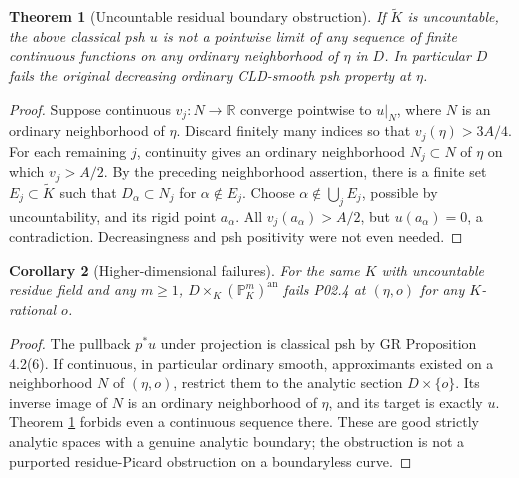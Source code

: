 \documentclass[11pt]{article}
\newtheorem{theorem}{Theorem}
\newtheorem{corollary}[theorem]{Corollary}
\theoremstyle{remark}
\newcommand{\an}{\mathrm{an}}
\begin{document}
\begin{theorem}[Uncountable residual boundary obstruction]\label{thm:obstruction}
If $\widetilde K$ is uncountable, the above classical psh $u$ is not a
pointwise limit of \emph{any sequence of finite continuous functions}
on any ordinary neighborhood of $\eta$ in $D$. In particular $D$ fails
the original decreasing ordinary CLD-smooth psh property at $\eta$.
\end{theorem}
\begin{proof}
Suppose continuous $v_j:N\to\mathbb R$ converge pointwise to $u|_N$,
where $N$ is an ordinary neighborhood of $\eta$. Discard finitely many
indices so that $v_j(\eta)>3A/4$. For each remaining $j$, continuity
gives an ordinary neighborhood $N_j\subset N$ of $\eta$ on which
$v_j>A/2$. By the preceding neighborhood assertion, there is a finite
set $E_j\subset\widetilde K$ such that $D_\alpha\subset N_j$ for
$\alpha\notin E_j$. Choose
$\alpha\notin\bigcup_jE_j$, possible by uncountability, and its rigid
point $a_\alpha$. All $v_j(a_\alpha)>A/2$, but $u(a_\alpha)=0$, a
contradiction. Decreasingness and psh positivity were not even needed.
\end{proof}

\begin{corollary}[Higher-dimensional failures]
For the same $K$ with uncountable residue field and any $m\geq1$,
$D\times_K(\mathbb P^m_K)^\an$ fails P02.4 at
$(\eta,o)$ for any $K$-rational $o$.
\end{corollary}
\begin{proof}
The pullback $p^*u$ under projection is classical psh by GR Proposition
4.2(6). If continuous, in particular ordinary smooth, approximants
existed on a neighborhood $N$ of $(\eta,o)$, restrict them to the
analytic section $D\times\{o\}$. Its inverse image of $N$ is an
ordinary neighborhood of $\eta$, and its target is exactly $u$.
Theorem \ref{thm:obstruction} forbids even a continuous sequence there.
These are good strictly analytic spaces with a genuine analytic boundary;
the obstruction is not a purported residue-Picard obstruction on a
boundaryless curve.
\end{proof}
\end{document}
